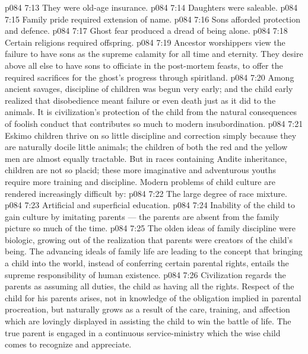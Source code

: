 \vs p084 7:13 \bibnobreakspace They were old\hyp{}age insurance.
\vs p084 7:14 \bibnobreakspace Daughters were saleable.
\vs p084 7:15 \bibnobreakspace Family pride required extension of name.
\vs p084 7:16 \bibnobreakspace Sons afforded protection and defence.
\vs p084 7:17 \bibnobreakspace Ghost fear produced a dread of being alone.
\vs p084 7:18 \bibnobreakspace Certain religions required offspring.
\vs p084 7:19 \pc Ancestor worshippers view the failure to have sons as the supreme calamity for all time and eternity. They desire above all else to have sons to officiate in the post\hyp{}mortem feasts, to offer the required sacrifices for the ghost’s progress through spiritland.
\vs p084 7:20 Among ancient savages, discipline of children was begun very early; and the child early realized that disobedience meant failure or even death just as it did to the animals. It is civilization’s protection of the child from the natural consequences of foolish conduct that contributes so much to modern insubordination.
\vs p084 7:21 Eskimo children thrive on so little discipline and correction simply because they are naturally docile little animals; the children of both the red and the yellow men are almost equally tractable. But in races containing Andite inheritance, children are not so placid; these more imaginative and adventurous youths require more training and discipline. Modern problems of child culture are rendered increasingly difficult by:
\vs p084 7:22 \bibnobreakspace The large degree of race mixture.
\vs p084 7:23 \bibnobreakspace Artificial and superficial education.
\vs p084 7:24 \bibnobreakspace Inability of the child to gain culture by imitating parents --- the parents are absent from the family picture so much of the time.
\vs p084 7:25 \pc The olden ideas of family discipline were biologic, growing out of the realization that parents were creators of the child’s being. The advancing ideals of family life are leading to the concept that bringing a child into the world, instead of conferring certain parental rights, entails the supreme responsibility of human existence.
\vs p084 7:26 Civilization regards the parents as assuming all duties, the child as having all the rights. Respect of the child for his parents arises, not in knowledge of the obligation implied in parental procreation, but naturally grows as a result of the care, training, and affection which are lovingly displayed in assisting the child to win the battle of life. The true parent is engaged in a continuous service\hyp{}ministry which the wise child comes to recognize and appreciate.
